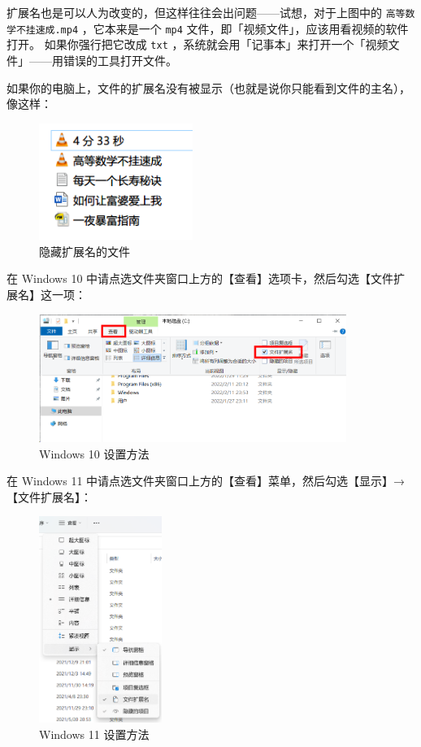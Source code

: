 扩展名也是可以人为改变的，但这样往往会出问题——试想，对于上图中的 \texttt{高等数学不挂速成.mp4} ，它本来是一个 \verb|mp4| 文件，即「视频文件」，应该用看视频的软件打开。
如果你强行把它改成 \verb|txt| ，系统就会用「记事本」来打开一个「视频文件」——用错误的工具打开文件。

如果你的电脑上，文件的扩展名没有被显示（也就是说你只能看到文件的主名），像这样：

\begin{figure}[htb!]
  \centering
  \includegraphics[width=5cm]{assets/Files_No_Ext.png}
  \caption{隐藏扩展名的文件}
  \label{File_No_Ext}
\end{figure}

在 Windows 10 中请点选文件夹窗口上方的【查看】选项卡，然后勾选【文件扩展名】这一项：

\begin{figure}[htb!]
  \centering
  \includegraphics[width=10cm]{assets/Windows_10_set_full_filename.png}
  \caption{Windows 10 设置方法}
  \label{Windows_10_set_full_filename}
\end{figure}

在 Windows 11 中请点选文件夹窗口上方的【查看】菜单，然后勾选【显示】→【文件扩展名】：

\begin{figure}[htb!]
  \centering
  \includegraphics[width=4cm]{assets/Windows_11_set_full_filename.png}
  \caption{Windows 11 设置方法}
  \label{Windows_11_set_full_filename}
\end{figure}

